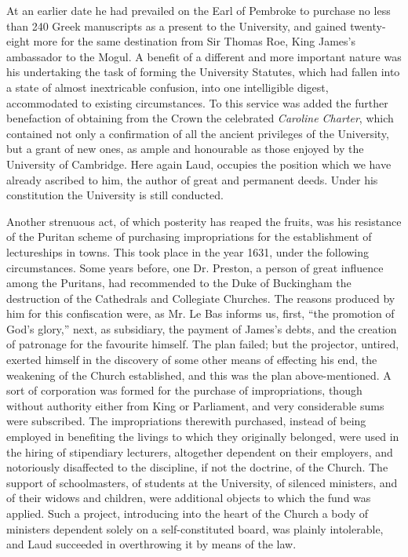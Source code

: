 At an earlier date he had prevailed on the Earl of
Pembroke to purchase no less than 240 Greek manuscripts as a present to
the University, and gained twenty-eight more for the same destination
from Sir Thomas Roe, King James's ambassador to the Mogul. A benefit of
a different and more important nature was his undertaking the task of
forming the University Statutes, which had fallen into a state of almost
inextricable confusion, into one intelligible digest, accommodated to
existing circumstances. To this service was added the further
benefaction of obtaining from the Crown the celebrated \emph{Caroline
Charter}, which contained not only a confirmation of all the ancient
privileges of the University, but a grant of new ones, as ample and
honourable as those enjoyed by the University of Cambridge. Here again
Laud, occupies the position which we have already ascribed to him,
the author of great and permanent deeds. Under his constitution the
University is still conducted.

Another strenuous act, of which posterity has
reaped the fruits, was his resistance of the Puritan scheme of
purchasing impropriations for the establishment of lectureships in
towns. This took place in the year 1631, under the following
circumstances. Some years before, one Dr. Preston, a person of great
influence among the Puritans, had recommended to the Duke of Buckingham
the destruction of the Cathedrals and Collegiate Churches. The reasons
produced by him for this confiscation were, as Mr. Le Bas informs us,
first, ``the promotion of God's glory,'' next, as subsidiary, the payment
of James's debts, and the creation of patronage for the favourite
himself. The plan failed; but the projector, untired, exerted himself in
the discovery of some other means of effecting his end, the weakening of
the Church established, and this was the plan above-mentioned. A sort of
corporation was formed for the purchase of impropriations, though
without authority either from King or Parliament, and very considerable
sums were subscribed. The impropriations therewith purchased, instead of
being employed in benefiting the livings to which they originally
belonged, were used in the hiring of stipendiary lecturers, altogether
dependent on their employers, and notoriously disaffected to the
discipline, if not the doctrine, of the Church. The support of
schoolmasters, of students at the University, of silenced ministers, and
of their widows and children, were additional objects to which the fund
was applied. Such a project, introducing into the heart of the Church a
body of ministers dependent solely on a self-constituted board, was
plainly intolerable, and Laud succeeded in overthrowing it by means of
the law.

